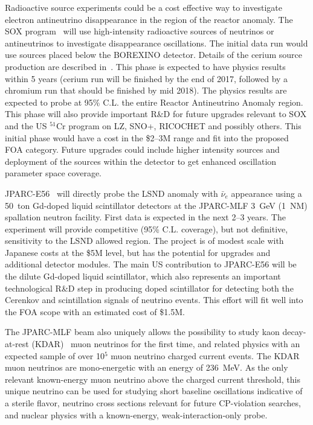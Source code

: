 \noindent Radioactive source experiments could be a cost effective way
to investigate electron antineutrino disappearance in the region of
the reactor anomaly. The SOX program~\cite{bib:SOX} will use
high-intensity radioactive sources of neutrinos or antineutrinos to
investigate disappearance oscillations. The initial data run would
use sources placed below the BOREXINO detector. Details of the cerium
source production are described in~\cite{bib:CL}. This phase is
expected to have physics results within 5 years (cerium run will be
finished by the end of 2017, followed by a chromium run that should be
finished by mid 2018). The physics results are expected to probe at
95\% C.L. the entire Reactor Antineutrino Anomaly region. This phase
will also provide important R\&D for future upgrades relevant to SOX
and the US $^{51}$Cr program on LZ, SNO+, RICOCHET and possibly
others. This initial phase would have a cost in
the \$2--3M range and fit into the proposed FOA category.
Future upgrades could include higher intensity sources and deployment
of the sources within the detector to get enhanced oscillation
parameter space coverage.


\noindent JPARC-E56~\cite{JPARC_P_56} will directly probe the LSND
anomaly with $\bar\nu_e$ appearance using a 50~ton Gd-doped liquid
scintillator detectors at the JPARC-MLF 3~GeV (1~NM) spallation
neutron facility. First data is expected in the next 2--3 years. The
experiment will provide competitive (95\% C.L. coverage), but not
definitive, sensitivity to the LSND allowed region. The project is of
modest scale with Japanese costs at the \$5M level, but has the
potential for upgrades and additional detector modules. The main US
contribution to JPARC-E56 will be the dilute Gd-doped liquid
scintillator, which also represents an important technological R\&D
step in producing doped scintillator for detecting both the Cerenkov
and scintillation signals of neutrino events. This effort will fit
well into the FOA scope with an estimated cost of \$1.5M.


The JPARC-MLF beam also uniquely allows the possibility to study kaon
decay-at-rest (KDAR)~\cite{KDAR} muon neutrinos for the first time,
and related physics with an expected sample of over 10$^5$ muon
neutrino charged current events. The KDAR muon neutrinos are
mono-energetic with an energy of 236~MeV. As the only relevant
known-energy muon neutrino above the charged current threshold, this
unique neutrino can be used for studying short baseline oscillations
indicative of a sterile flavor, neutrino cross sections relevant for
future CP-violation searches, and nuclear physics with a known-energy,
weak-interaction-only probe.

